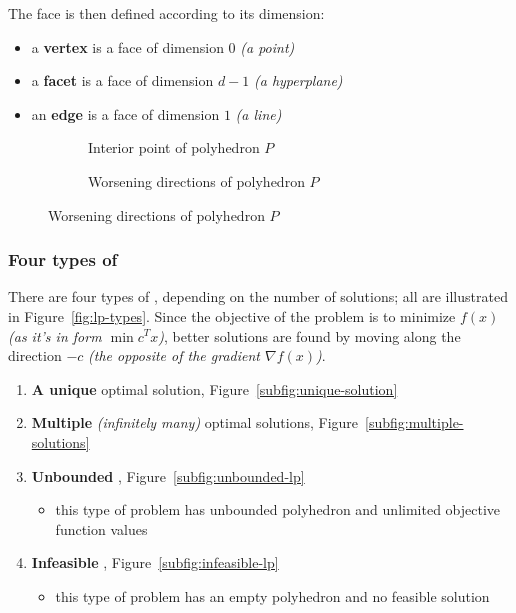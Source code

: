 \documentclass[english]{article}
\begin{document}
The face is then defined according to its dimension:

\begin{itemize}
  \item a \textbf{vertex} is a face of dimension \(0\) \textit{(a point)}
  \item a \textbf{facet} is a face of dimension \(d-1\) \textit{(a hyperplane)}
  \item an \textbf{edge} is a face of dimension \(1\) \textit{(a line)}
\end{itemize}

\begin{figure}[htbp]
  \bigskip
  \centering
  \begin{subfigure}[b]{0.495\textwidth}
    \bigskip
    \centering
    \caption{Interior point of polyhedron \(P\)}
    \label{subfig:interior-point-solution}
    \bigskip
  \end{subfigure}
  \begin{subfigure}[b]{0.495\textwidth}
    \bigskip
    \centering
    \caption{Worsening directions of polyhedron \(P\)}
    \label{subfig:worsening-point-direction}
    \bigskip
  \end{subfigure}
  \bigskip
\end{figure}

\subsubsection{Four types of \LP}

There are four types of \LP, depending on the number of solutions; all are illustrated in Figure~\ref{fig:lp-types}.
Since the objective of the problem is to minimize \(f(x)\) \textit{(as it's in form \(\min c^T x\))}, better solutions are found by moving along the direction \(-c\) \textit{(the opposite of the gradient \(\nabla f(x)\))}.

\begin{enumerate}
  \item \textbf{A unique} optimal solution, Figure~\ref{subfig:unique-solution}
  \item \textbf{Multiple} \textit{(infinitely many)} optimal solutions, Figure~\ref{subfig:multiple-solutions}
  \item \textbf{Unbounded} \LP, Figure~\ref{subfig:unbounded-lp}
        \begin{itemize}
          \item this type of problem has unbounded polyhedron and unlimited objective function values
        \end{itemize}
  \item \textbf{Infeasible} \LP, Figure~\ref{subfig:infeasible-lp}
        \begin{itemize}
          \item this type of problem has an empty polyhedron and no feasible solution
        \end{itemize}
\end{enumerate}
\end{document}
